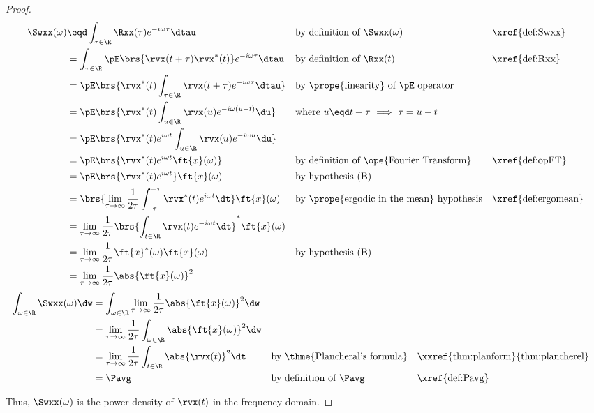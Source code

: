 \begin{proof}
\begin{align*}
   \Swxx(\omega)
     &\eqd \int_{\tau\in\R}\Rxx(\tau) e^{-i\omega\tau} \dtau
     &&    \text{by definition of $\Swxx(\omega)$}
     &&    \text{\xref{def:Swxx}}
   \\&=    \int_{\tau\in\R}\pE\brs{\rvx(t+\tau)\rvx^\ast(t)} e^{-i\omega\tau} \dtau
     &&    \text{by definition of $\Rxx(t)$}
     &&    \text{\xref{def:Rxx}}
   \\&=    \pE\brs{\rvx^\ast(t) \int_{\tau\in\R}\rvx(t+\tau) e^{-i\omega\tau} \dtau }
     &&    \text{by \prope{linearity} of $\pE$ operator}
   \\&=    \pE\brs{\rvx^\ast(t) \int_{u\in\R}\rvx(u) e^{-i\omega(u-t)} \du }
     &&    \text{where $u\eqd t+\tau$ $\implies$ $\tau=u-t$}
   \\&=    \pE\brs{\rvx^\ast(t)e^{i\omega t} \int_{u\in\R}\rvx(u) e^{-i\omega u} \du }
   \\&=    \pE\brs{\rvx^\ast(t)e^{i\omega t} \ft{x}(\omega) }
     &&    \text{by definition of \ope{Fourier Transform}}
     &&    \text{\xref{def:opFT}}
   \\&=    \pE\brs{\rvx^\ast(t)e^{i\omega t}} \ft{x}(\omega)
     &&    \text{by hypothesis (B)}
   \\&=    \brs{\lim_{\tau\to\infty}\frac{1}{2\tau}\int_{-\tau}^{+\tau} \rvx^\ast(t)e^{i\omega t} \dt} \ft{x}(\omega)
     &&    \text{by \prope{ergodic in the mean} hypothesis}
     &&    \text{\xref{def:ergomean}}
   \\&=    \lim_{\tau\to\infty}\frac{1}{2\tau}\brs{\int_{t\in\R}\rvx(t)e^{-i\omega t} \dt}^\ast \ft{x}(\omega)
   \\&=    \lim_{\tau\to\infty}\frac{1}{2\tau} \ft{x}^\ast(\omega) \ft{x}(\omega)
     &&    \text{by hypothesis (B)}
   \\&=    \lim_{\tau\to\infty}\frac{1}{2\tau} \abs{\ft{x}(\omega)}^2
\end{align*}
\begin{align*}
   \int_{\omega\in\R} \Swxx(\omega) \dw
     &= \int_{\omega\in\R} \lim_{\tau\to\infty}\frac{1}{2\tau} \abs{\ft{x}(\omega)}^2 \dw
   \\&= \lim_{\tau\to\infty}\frac{1}{2\tau} \int_{\omega\in\R} \abs{\ft{x}(\omega)}^2 \dw
   \\&= \lim_{\tau\to\infty}\frac{1}{2\tau} \int_{t\in\R} \abs{\rvx(t)}^2 \dt
     && \text{by \thme{Plancheral's formula}}
     && \text{\xxref{thm:planform}{thm:plancherel}}
   \\&= \Pavg
     && \text{by definition of $\Pavg$}
     && \text{\xref{def:Pavg}}
\end{align*}

Thus, $\Swxx(\omega)$ is the power density of $\rvx(t)$ in the frequency domain.
\end{proof}

